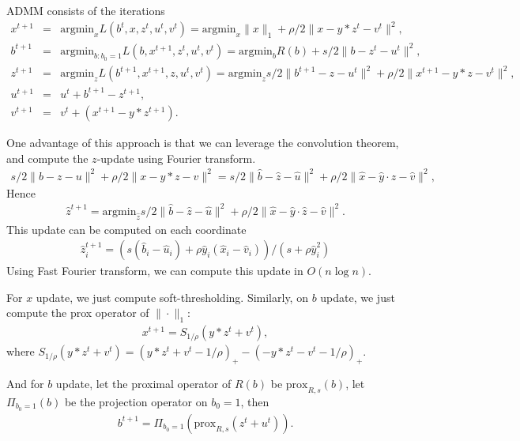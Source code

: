 \documentclass[letter, 10pt]{article}
\numberwithin{equation}{section}
\begin{document}
ADMM consists of the iterations
\begin{eqnarray*}
x^{t+1}&=&\mathrm{argmin}_{x} L(b^{t}, x , z^{t}, u^{t}, v^{t})
= \mathrm{argmin}_{x} \|x\|_1+ \rho /2 \| x-y*z^{t}-v^{t}\|^2,\\
b^{t+1}&=&\mathrm{argmin}_{b: b_0=1} L(b, x^{t+1} , z^{t}, u^{t}, v^{t})
=\mathrm{argmin}_{b} R(b) +s/2 \| b-z^{t}-u^{t}\|^2,\\
z^{t+1}&=&\mathrm{argmin}_{z} L(b^{t+1}, x^{t+1}, z , u^{t}, v^{t})
= \mathrm{argmin}_{z} s/2 \| b^{t+1}-z-u^{t}\|^2 +
 \rho /2 \| x^{t+1}-y*z-v^{t}\|^2, \\
u^{t+1}&=& u^t + b^{t+1}-z^{t+1},\\
v^{t+1}&=& v^{t}+ (x^{t+1}-y*z^{t+1}).
 \end{eqnarray*}

One advantage of this approach is that we can leverage the convolution theorem, and compute the $z$-update using Fourier transform.  
 \begin{eqnarray*}
 s/2 \| b-z-u\|^2 +
 \rho /2 \| x-y*z-v\|^2 
 = s/2 \| \hat b-\hat z- \hat u\|^2 +
 \rho /2 \| \hat x-\hat y\cdot \hat z-\hat v\|^2,
  \end{eqnarray*}
 Hence  
  \begin{eqnarray*}
 \hat z^{t+1} 
 =\mathrm{argmin}_{\hat z} s/2 \| \hat b-\hat z- \hat u\|^2 +
 \rho /2 \| \hat x-\hat y\cdot \hat z-\hat v\|^2 .
  \end{eqnarray*} 
  This update can be computed on each coordinate
    \begin{eqnarray*}
 \hat z^{t+1}_i
 = (s(\hat b_i- \hat u_i)+\rho \hat y_i (\hat x_i-\hat v_i))/(s +\rho \hat y_i^2)
  \end{eqnarray*} 
 Using Fast Fourier transform, we can compute this update in $O(n\log n)$. 
  
For $x$ update, we just compute soft-thresholding. Similarly, on $b$ update, we just compute the prox operator of $\|\cdot\|_1$:
   \begin{eqnarray*}
 x^{t+1}
 = S_{1/\rho}(y*z^{t}+v^{t}),
  \end{eqnarray*}
  where $S_{1/\rho} (y*z^{t}+v^{t}) = 
  (y*z^{t}+v^{t}-1/\rho)_{+} - (-y*z^{t}-v^{t}-1/\rho)_{+}$.
  
  And for $b$ update, let the proximal operator of $ R(b)$ be $\mbox{prox}_{R, s}(b)$, let $\Pi_{b_0=1}(b)$ be the projection operator on $b_0 =1$, then
     \begin{eqnarray*}
 b^{t+1}
 = \Pi_{b_0=1}(\mbox{prox}_{R, s}(z^t+u^t)).
  \end{eqnarray*}
\end{document}
